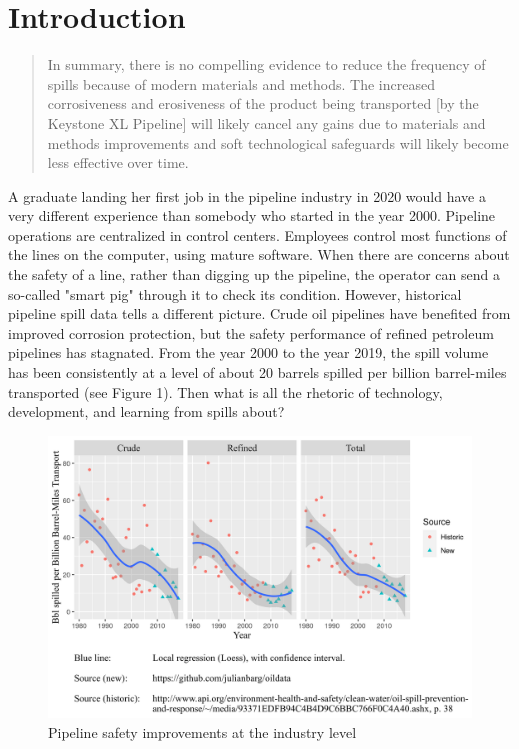 \section{Introduction}

\begin{quote}
	In summary, there is no compelling evidence to reduce the frequency of spills because of modern materials and methods. The increased corrosiveness and erosiveness of the product being transported [by the Keystone XL Pipeline] will likely cancel any gains due to materials and methods improvements and soft technological safeguards will likely become less effective over time. \citep{Stansbury2011}
\end{quote}

A graduate landing her first job in the pipeline industry in 2020 would have a very different experience than somebody who started in the year 2000. Pipeline operations are centralized in control centers. Employees control most functions of the lines on the computer, using mature software. When there are concerns about the safety of a line, rather than digging up the pipeline, the operator can send a so-called "smart pig" through it to check its condition. However, historical pipeline spill data tells a different picture. Crude oil pipelines have benefited from improved corrosion protection, but the safety performance of refined petroleum pipelines has stagnated. From the year 2000 to the year 2019, the spill volume has been consistently at a level of about 20 barrels spilled per billion barrel-miles transported (see Figure 1). Then what is all the rhetoric of technology, development, and learning from spills about?

\begin{figure}
	\caption{Pipeline safety improvements at the industry level}
	\centerline{\includegraphics{../illustrations/population_learning_4.png}}
\end{figure}

